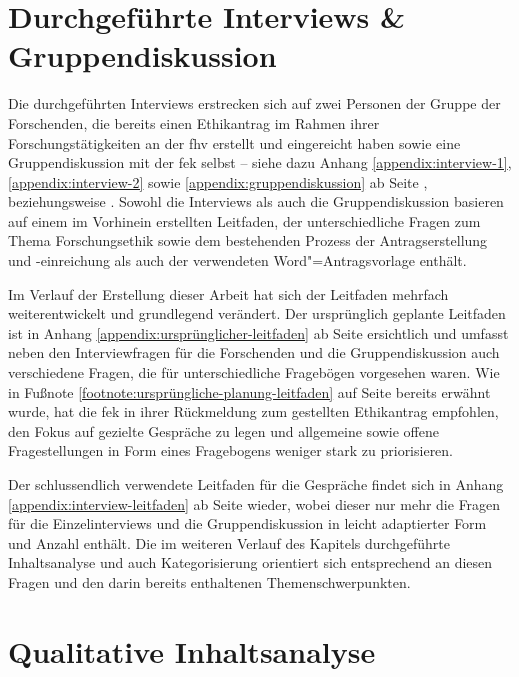 \documentclass[a4paper,12pt,twoside]{scrreprt}
\begin{document}
\section{Durchgeführte Interviews \& Gruppendiskussion}
\label{sec:durchgeführte-interviews-gruppendiskussion}

Die durchgeführten Interviews erstrecken sich auf zwei Personen der Gruppe der Forschenden, die bereits einen Ethikantrag im Rahmen ihrer Forschungstätigkeiten an der \acl{fhv} erstellt und eingereicht haben sowie eine Gruppendiskussion mit der \ac{fek} selbst -- siehe dazu Anhang \ref{appendix:interview-1}, \ref{appendix:interview-2} sowie \ref{appendix:gruppendiskussion} ab Seite \pageref{appendix:interview-1}, \pageref{appendix:interview-2} beziehungsweise \pageref{appendix:gruppendiskussion}. Sowohl die Interviews als auch die Gruppendiskussion basieren auf einem im Vorhinein erstellten Leitfaden, der unterschiedliche Fragen zum Thema Forschungsethik sowie dem bestehenden Prozess der Antragserstellung und -einreichung als auch der verwendeten Word"=Antragsvorlage enthält.

\medskip

Im Verlauf der Erstellung dieser Arbeit hat sich der Leitfaden mehrfach weiterentwickelt und grundlegend verändert. Der ursprünglich geplante Leitfaden ist in Anhang \ref{appendix:ursprünglicher-leitfaden} ab Seite \pageref{appendix:ursprünglicher-leitfaden} ersichtlich und umfasst neben den Interviewfragen für die Forschenden und die Gruppendiskussion auch verschiedene Fragen, die für unterschiedliche Fragebögen vorgesehen waren. Wie in Fußnote \ref{footnote:ursprüngliche-planung-leitfaden} auf Seite \pageref{footnote:ursprüngliche-planung-leitfaden} bereits erwähnt wurde, hat die \ac{fek} in ihrer Rückmeldung zum gestellten Ethikantrag empfohlen, den Fokus auf gezielte Gespräche zu legen und allgemeine sowie offene Fragestellungen in Form eines Fragebogens weniger stark zu priorisieren.

Der schlussendlich verwendete Leitfaden für die Gespräche findet sich in Anhang \ref{appendix:interview-leitfaden} ab Seite \pageref{appendix:interview-leitfaden} wieder, wobei dieser nur mehr die Fragen für die Einzelinterviews und die Gruppendiskussion in leicht adaptierter Form und Anzahl enthält. Die im weiteren Verlauf des Kapitels durchgeführte Inhaltsanalyse und auch Kategorisierung orientiert sich entsprechend an diesen Fragen und den darin bereits enthaltenen Themenschwerpunkten.

\section{Qualitative Inhaltsanalyse}
\label{sec:qualitative-inhaltsanalyse}
\end{document}
